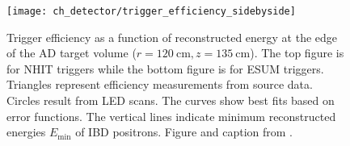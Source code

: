 \begin{figure}
    \centering
    \texttt{[image: ch\_detector/trigger\_efficiency\_sidebyside]}
    \caption[Trigger efficiency]{
        Trigger efficiency as a function of reconstructed energy
        at the edge of the AD target volume ($r=\SI{120}{\cm},z=\SI{135}{\cm}$).
        The top figure is for NHIT triggers while the bottom figure is for ESUM triggers.
        Triangles represent efficiency measurements from  source data.
        Circles result from LED scans.
        The curves show best fits based on error functions.
        The vertical lines indicate minimum reconstructed energies $E_{\text{min}}$
        of IBD positrons.
        Figure and caption from \cite{sidebyside}.
    }
    \label{fig:trig_eff}
\end{figure}

